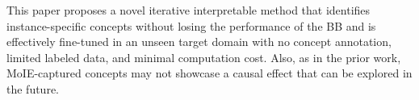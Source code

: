 This paper proposes a novel iterative interpretable method that identifies instance-specific concepts without losing the performance of the BB and is effectively fine-tuned in an unseen target domain with no concept annotation, limited labeled data, and minimal computation cost. Also, as in the prior work, MoIE-captured concepts may not showcase a causal effect that can be explored in the future.
